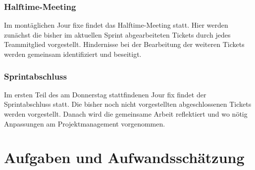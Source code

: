 \documentclass[a4paper,11pt,listof=numbered,glossary=totoc,parskip=half,toc=bib]{scrreprt}
\begin{document}
\subsubsection{Halftime-Meeting}
Im montäglichen Jour fixe findet das Halftime-Meeting statt. Hier werden zunächst die bisher im aktuellen Sprint abgearbeiteten Tickets durch jedes Teammitglied vorgestellt. Hindernisse bei der Bearbeitung der weiteren Tickets werden gemeinsam identifiziert und beseitigt.

\subsubsection{Sprintabschluss}
Im ersten Teil des am Donnerstag stattfindenen Jour fix findet der Sprintabschluss statt. Die bisher noch nicht vorgestellten abgeschlossenen Tickets werden vorgestellt. Danach wird die gemeinsame Arbeit reflektiert und wo nötig Anpassungen am Projektmanagement vorgenommen.


	
	\newpage
	\section{Aufgaben und Aufwandsschätzung}
	\label{sec:aufwand}
	
\end{document}
